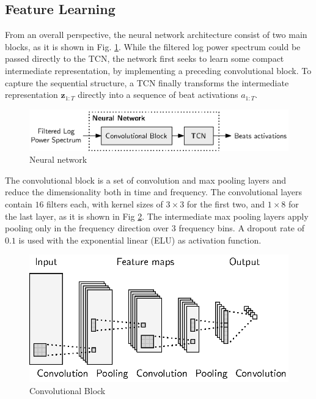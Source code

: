 \documentclass{scrartcl}
\begin{document}
\subsection{Feature Learning}
From an overall perspective, the neural network architecture consist of two main blocks, as it is shown in Fig. \ref{fig:neural_net}. While the filtered log power spectrum could be passed directly to the TCN, the network first seeks to learn some compact intermediate representation, by implementing a preceding convolutional block. To capture the sequential structure, a TCN finally transforms the intermediate representation $\mathbf z_{1:T}$ directly into a sequence of beat activations $a_{1:T}$.
\begin{figure}[htbp]
\centering
\includegraphics[scale=1.0]{figures/neural_net.eps}
\caption{Neural network}
\label{fig:neural_net}
\end{figure}    

The convolutional block is a set of convolution and max pooling layers and reduce the dimensionality both in time and frequency. The convolutional layers contain $16$ filters each, with kernel sizes of $3\times3$ for the first two, and $1\times8$ for the last layer, as it is shown in Fig \ref{fig:conv_block}. The intermediate max pooling layers apply pooling only in the frequency direction over $3$ frequency bins. A dropout \cite{Tompson2015} rate of $0.1$ is used with the exponential linear (ELU) \cite{Clevert2015} as activation function.
\begin{figure}[htbp]
\centering
\includegraphics[scale=1.0]{figures/conv_block.eps}
\caption{Convolutional Block}
\label{fig:conv_block}
\end{figure}    
\end{document}
